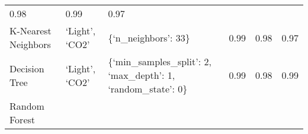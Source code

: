 \documentclass[11pt]{article}
\begin{document}
\begin{longtable}[]{@{}llllll@{}}
\begin{minipage}[t]{0.08\columnwidth}
0.98\strut
\end{minipage} & \begin{minipage}[t]{0.07\columnwidth}\raggedright
0.99\strut
\end{minipage} & \begin{minipage}[t]{0.07\columnwidth}\raggedright
0.97\strut
\end{minipage}\tabularnewline
\begin{minipage}[t]{0.11\columnwidth}\raggedright
K-Nearest Neighbors\strut
\end{minipage} & \begin{minipage}[t]{0.17\columnwidth}\raggedright
`Light', `CO2'\strut
\end{minipage} & \begin{minipage}[t]{0.33\columnwidth}\raggedright
\{`n\_neighbors': 33\}\strut
\end{minipage} & \begin{minipage}[t]{0.08\columnwidth}\raggedright
0.99\strut
\end{minipage} & \begin{minipage}[t]{0.07\columnwidth}\raggedright
0.98\strut
\end{minipage} & \begin{minipage}[t]{0.07\columnwidth}\raggedright
0.97\strut
\end{minipage}\tabularnewline
\begin{minipage}[t]{0.11\columnwidth}\raggedright
Decision Tree\strut
\end{minipage} & \begin{minipage}[t]{0.17\columnwidth}\raggedright
`Light', `CO2'\strut
\end{minipage} & \begin{minipage}[t]{0.33\columnwidth}\raggedright
\{`min\_samples\_split': 2, `max\_depth': 1, `random\_state': 0\}\strut
\end{minipage} & \begin{minipage}[t]{0.08\columnwidth}\raggedright
0.99\strut
\end{minipage} & \begin{minipage}[t]{0.07\columnwidth}\raggedright
0.98\strut
\end{minipage} & \begin{minipage}[t]{0.07\columnwidth}\raggedright
0.99\strut
\end{minipage}\tabularnewline
\begin{minipage}[t]{0.11\columnwidth}\raggedright
Random Forest\strut
\end{minipage} & \begin{minipage}[t]{0.17\columnwidth}\raggedright

\end{minipage}
\end{longtable}
\end{document}
